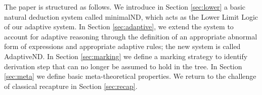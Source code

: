 \documentclass[]{article}
\begin{document}

The paper is structured as follows. We introduce in Section \ref{sec:lower} a basic natural deduction system called {\sf minimalND}, which acts as the Lower Limit Logic of our adaptive system. In Section \ref{sec:adaptive}, we extend the system to account for adaptive reasoning through the definition of an appropriate abnormal form of expressions and appropriate adaptive rules; the new system is called {\sf AdaptiveND}. In Section \ref{sec:marking} we define a marking strategy to identify derivation step that can no longer be assumed to hold in the tree. In Section \ref{sec:meta} we define basic meta-theoretical properties. We return to the challenge of classical recapture in Section \ref{sec:recap}.


\end{document}
